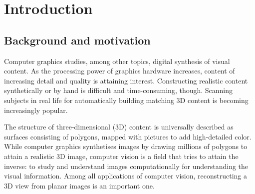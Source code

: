 \section{Introduction}



\thispagestyle{empty}

\subsection{Background and motivation}

Computer graphics studies, among other topics, digital synthesis of visual content.
As the processing power of graphics hardware increases, content of increasing detail and quality is attaining interest.
Constructing realistic content synthetically or by hand is difficult and time-consuming, though.
Scanning subjects in real life for automatically building matching 3D content is becoming increasingly popular.


The structure of three-dimensional (3D) content is universally described as surfaces consisting of polygons, mapped with pictures to add high-detailed color.
While computer graphics synthetises images by drawing millions of polygons to attain a realistic 3D image, computer vision is a field that tries to attain the inverse:
to study and understand images computationally for understanding the visual information.
Among all applications of computer vision, reconstructing a 3D view from planar images is an important one.


